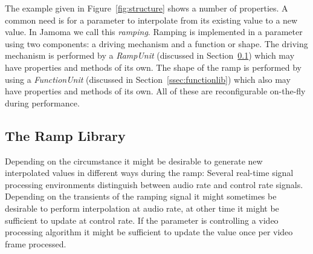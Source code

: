 \documentclass{article}
\begin{document}
The example given in Figure~\ref{fig:structure} shows a number of properties. A common need is for a parameter to interpolate from its existing value to a new value.  In Jamoma we call this \emph{ramping}. Ramping is implemented in a parameter using two components: a driving mechanism and a function or shape. The driving mechanism is performed by a \emph{RampUnit} (discussed in Section~\ref{ssec:ramplib}) which may have properties and methods of its own. The shape of the ramp is performed by using a \emph{FunctionUnit} (discussed in Section~\ref{ssec:functionlib}) which also may have properties and methods of its own. All of these are reconfigurable on-the-fly during performance.


\subsection{The Ramp Library} %
\label{ssec:ramplib}


Depending on the circumstance it might be desirable to generate new interpolated values in different ways during the ramp: Several real-time signal processing environments distinguish between audio rate and control rate signals. Depending on the transients of the ramping signal it might sometimes be desirable to perform interpolation at audio rate, at other time it might be sufficient to update at  control rate. If the parameter is controlling a video processing algorithm it might be sufficient to update the value once per video frame processed.


\end{document}
